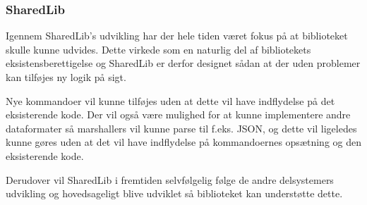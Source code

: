 \subsubsection{SharedLib}
Igennem SharedLib's udvikling har der hele tiden været fokus på at biblioteket skulle kunne udvides. Dette virkede som en naturlig del af bibliotekets eksistensberettigelse og SharedLib er derfor designet sådan at der uden problemer kan tilføjes ny logik på sigt. 

Nye kommandoer vil kunne tilføjes uden at dette vil have indflydelse på det eksisterende kode. Der vil også være mulighed for at kunne implementere andre dataformater så marshallers vil kunne parse til f.eks. JSON, og dette vil ligeledes kunne gøres uden at det vil have indflydelse på kommandoernes opsætning og den eksisterende kode.

Derudover vil SharedLib i fremtiden selvfølgelig følge de andre delsystemers udvikling og hovedsageligt blive udviklet så biblioteket kan understøtte dette.